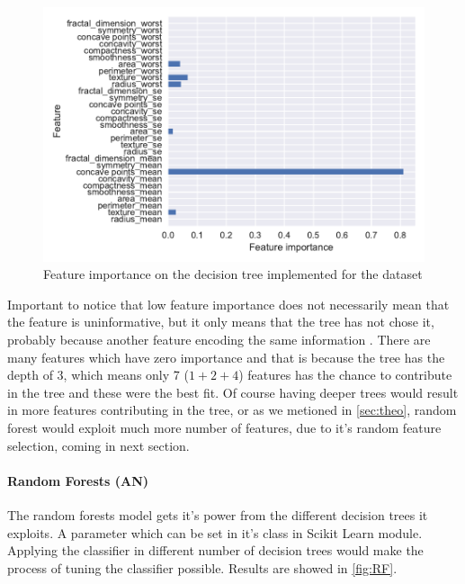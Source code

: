 \documentclass[12pt, a4paper]{scrartcl}
\begin{document}
\begin{figure}[h]
	\centering
	\includegraphics[width=.6\textwidth]{feature_importance}
	\caption{Feature importance on the decision tree implemented for the dataset}
	\label{fig:feature_importance}
\end{figure}

Important to notice that low feature importance does not necessarily mean that the feature is uninformative, but it only means that the tree has not chose it, probably because another feature encoding the same information \citep{muller2016introduction}. There are many features which have zero importance and that is because the tree has the depth of 3, which means only 7 ($1+2+4$) features has the chance to contribute in the tree and these were the best fit. Of course having deeper trees would result in more features contributing in the tree, or as we metioned in \cref{sec:theo}, random forest would exploit much more number of features, due to it's random feature selection, coming in next section.

\paragraph{Random Forests (AN)} The random forests model gets it's power from the different decision trees it exploits. A parameter which can be set in it's class in Scikit Learn module. Applying the classifier in different number of decision trees would make the process of tuning the classifier possible. Results are showed in \cref{fig:RF}.
\end{document}
